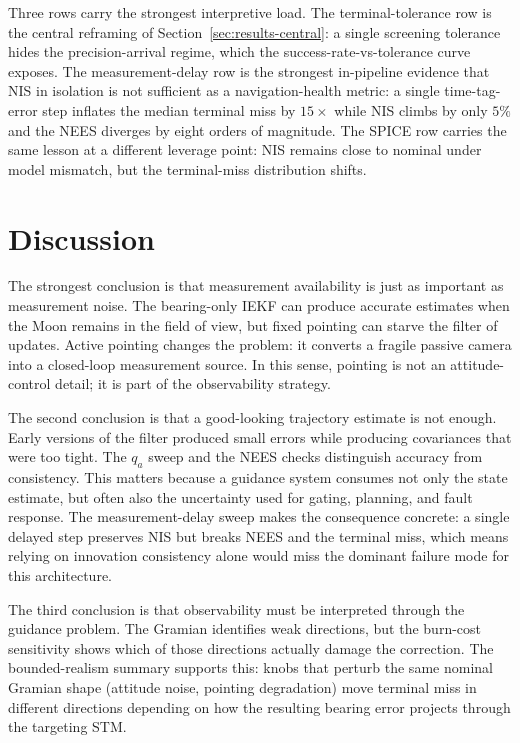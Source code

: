 \documentclass[10pt,twocolumn]{article}
\begin{document}
Three rows carry the strongest interpretive load.  The terminal-tolerance row is the central reframing of Section~\ref{sec:results-central}: a single screening tolerance hides the precision-arrival regime, which the success-rate-vs-tolerance curve exposes.  The measurement-delay row is the strongest in-pipeline evidence that NIS in isolation is not sufficient as a navigation-health metric: a single time-tag-error step inflates the median terminal miss by $15\times$ while NIS climbs by only $5\%$ and the NEES diverges by eight orders of magnitude.  The SPICE row carries the same lesson at a different leverage point: NIS remains close to nominal under model mismatch, but the terminal-miss distribution shifts.

\section{Discussion}
\label{sec:discussion}

The strongest conclusion is that measurement availability is just as important as measurement noise.  The bearing-only IEKF can produce accurate estimates when the Moon remains in the field of view, but fixed pointing can starve the filter of updates.  Active pointing changes the problem: it converts a fragile passive camera into a closed-loop measurement source.  In this sense, pointing is not an attitude-control detail; it is part of the observability strategy.

The second conclusion is that a good-looking trajectory estimate is not enough.  Early versions of the filter produced small errors while producing covariances that were too tight.  The $q_a$ sweep and the NEES checks distinguish accuracy from consistency.  This matters because a guidance system consumes not only the state estimate, but often also the uncertainty used for gating, planning, and fault response.  The measurement-delay sweep makes the consequence concrete: a single delayed step preserves NIS but breaks NEES and the terminal miss, which means relying on innovation consistency alone would miss the dominant failure mode for this architecture.

The third conclusion is that observability must be interpreted through the guidance problem.  The Gramian identifies weak directions, but the burn-cost sensitivity shows which of those directions actually damage the correction.  The bounded-realism summary supports this: knobs that perturb the same nominal Gramian shape (attitude noise, pointing degradation) move terminal miss in different directions depending on how the resulting bearing error projects through the targeting STM.
\end{document}
